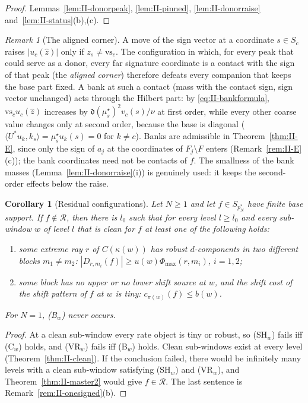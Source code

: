 \documentclass[10pt]{amsart}
\newtheorem{corollary}[theorem]{Corollary}
\theoremstyle{definition}
\theoremstyle{remark}
\newtheorem{remark}[theorem]{Remark}
\newcommand{\Rec}{\mathcal R}
\newcommand{\zh}{\hat z}
\newcommand{\ip}[2]{\langle #1,#2\rangle}
\begin{document}
\begin{proof}
Lemmas~\ref{lem:II-donorpeak}, \ref{lem:II-pinned}, \ref{lem:II-donorraise}
and~\ref{lem:II-status}(b),(c).
\end{proof}

\begin{remark}[The aligned corner]\label{rem:II-AC}
A move of the sign vector at a coordinate $s\in S_c$ raises $|u_c(\zh)|$
only if $z_s\ne\mathrm{vs}_c$.  The configuration in which, for every peak
that could serve as a donor, every far signature coordinate is a contact
with the sign of that peak (the \emph{aligned corner}) therefore defeats
every companion that keeps the base part fixed.  A bank at such a contact
(mass with the contact sign, sign vector unchanged) acts through the
Hilbert part: by \eqref{eq:II-bankformula}, $\mathrm{vs}_cu_c(\zh)$ increases
by $\mathfrak d(\mu^\star_s)^2v_c(s)/\nu$ at first order, while every other
coarse value changes only at second order, because the base is diagonal
($\ip{U^*u_k}{k_s}=\mu^\star_su_k(s)=0$ for $k\ne c$).  Banks are admissible
in Theorem~\ref{thm:II-E}, since only the sign of $a_j$ at the coordinates of
$F_j\setminus F$ enters (Remark~\ref{rem:II-E}(c)); the bank coordinates need
not be contacts of $f$.  The smallness of the bank masses
(Lemma~\ref{lem:II-donorraise}(i)) is genuinely used: it keeps the
second-order effects below the raise.
\end{remark}

\begin{corollary}[Residual configurations]\label{cor:II-residual}
Let $N\ge1$ and let $f\in S_{p_N^*}$ have finite base support.  If
$f\notin\Rec$, then there is $l_0$ such that for every level $l\ge l_0$ and
every sub-window $w$ of level $l$ that is clean for $f$ at least one of the
following holds:
\begin{enumerate}
\item[\textup{(B$_w$)}] some extreme ray $r$ of $C(\kappa(w))$ has robust
$d$-components in two different blocks $m_1\ne m_2$:
$|D_{r,m_i}(f)|\ge u(w)\Phi_{\max}(r,m_i)$, $i=1,2$;
\item[\textup{(C$_w$)}] some block has no upper or no lower shift source at
$w$, and the shift cost of the shift pattern of $f$ at $w$ is tiny:
$c_{\pi(w)}(f)\le b(w)$.
\end{enumerate}
For $N=1$, \textup{(B$_w$)} never occurs.
\end{corollary}

\begin{proof}
At a clean sub-window every rate object is tiny or robust, so (SH$_w$)
fails iff (C$_w$) holds, and (VR$_w$) fails iff (B$_w$) holds.  Clean
sub-windows exist at every level (Theorem~\ref{thm:II-clean}).  If the
conclusion failed, there would be infinitely many levels with a clean
sub-window satisfying (SH$_w$) and (VR$_w$), and
Theorem~\ref{thm:II-master2} would give $f\in\Rec$.  The last sentence is
Remark~\ref{rem:II-onesigned}(b).
\end{proof}
\end{document}
